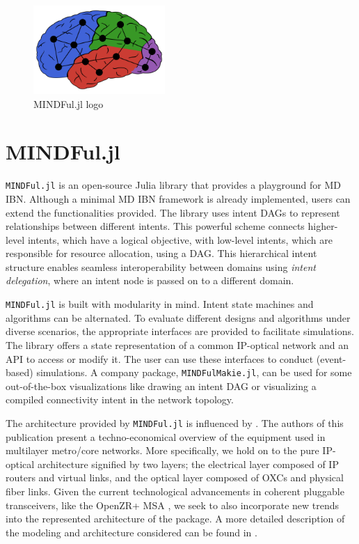 \documentclass{juliacon}
\begin{document}
    \begin{figure}[b]
    \centerline{\includegraphics[width=5cm]{logo.pdf}}
    \caption{MINDFul.jl logo}
        \label{fig:logo}
    \end{figure}

\section{MINDFul.jl}
\verb|MINDFul.jl| is an open-source Julia library that provides a playground for \ac{MD} \ac{IBN}.
Although a minimal \ac{MD} \ac{IBN} framework is already implemented, users can extend the functionalities provided.
The library uses intent \acp{DAG} \cite{2023ChristouITG} to represent relationships between different intents.
This powerful scheme connects higher-level intents, which have a logical objective, with low-level intents, which are responsible for resource allocation, using a \ac{DAG}.
This hierarchical intent structure enables seamless interoperability between domains using \emph{intent delegation}, where an intent node is passed on to a different domain.

\verb|MINDFul.jl| is built with modularity in mind.
Intent state machines and algorithms can be alternated.
To evaluate different designs and algorithms under diverse scenarios, the appropriate interfaces are provided to facilitate simulations. 
The library offers a state representation of a common IP-optical network and an \ac{API} to access or modify it. 
The user can use these interfaces to conduct (event-based) simulations.
A company package, \verb|MINDFulMakie.jl|, can be used for some out-of-the-box visualizations like drawing an intent \ac{DAG} or visualizing a compiled connectivity intent in the network topology.

The architecture provided by \verb|MINDFul.jl| is influenced by \cite{2013Rambach}.
The authors of this publication present a techno-economical overview of the equipment used in multilayer metro/core networks.
More specifically, we hold on to the pure IP-optical architecture signified by two layers; the electrical layer composed of IP routers and virtual links, and the optical layer composed of \acp{OXC} and physical fiber links.
Given the current technological advancements in coherent pluggable transceivers, like the OpenZR+ \ac{MSA} \cite{OpenZRProps}, we seek to also incorporate new trends into the represented architecture of the package.
A more detailed description of the modeling and architecture considered can be found in \cite{2022ChristouPlug}.
\end{document}
